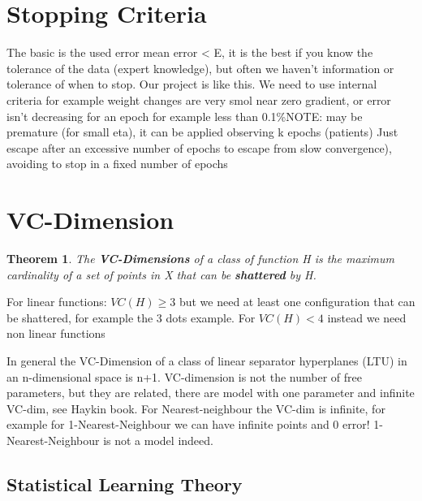\documentclass[12pt]{book}
\newtheorem{theorem}{Theorem}
\begin{document}
\section{Stopping Criteria}

The basic is the used error mean error < E, it is the best if you know the tolerance of the data (expert knowledge), but often we haven't information or tolerance of when to stop. Our project is like this. We need to use internal criteria for example weight changes are very smol near zero gradient, or error isn't decreasing for an epoch for example less than 0.1\%NOTE: may be premature (for small eta), it can be applied observing k epochs (patients)
\newline\newline
Just escape after an excessive number of epochs to escape from slow convergence), avoiding to stop in a fixed number of epochs



\section{VC-Dimension}

\begin{theorem}
	The \textbf{VC-Dimensions} of a class of function H is the maximum cardinality of a set of points in X that can be \textbf{shattered} by H.
\end{theorem}
\newline\newline
For linear functions: \newline
$VC(H) \geq 3$ but we need at least one configuration that can be shattered, for example the 3 dots example.
For $VC(H) < 4$ instead we need non linear functions

\newline\newline
\label{VC-dimension-space}
In general the VC-Dimension of a class of linear separator hyperplanes (LTU) in an n-dimensional space is n+1.
\newline\newline
VC-dimension is not the number of free parameters, but they are related, there are model with one parameter and infinite VC-dim, see Haykin book. For Nearest-neighbour the VC-dim is infinite, for example for 1-Nearest-Neighbour we can have infinite points and 0 error!
1-Nearest-Neighbour is not a model indeed.

\subsection{Statistical Learning Theory}
\end{document}
